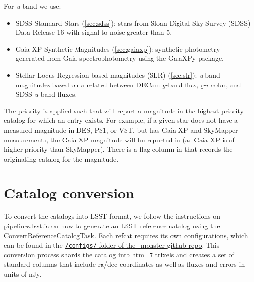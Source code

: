 For \textit{u}-band we use:
\begin{itemize}
    \item SDSS Standard Stars (\ref{sec:sdss}): stars from Sloan Digital Sky Survey (SDSS) Data Release 16 with signal-to-noise greater than 5.
    \item Gaia XP Synthetic Magnitudes (\ref{sec:gaiaxp}): synthetic photometry generated from Gaia spectrophotometry using the GaiaXPy package.
    \item Stellar Locus Regression-based magnitudes (SLR) (\ref{sec:slr}): \textit{u}-band magnitudes based on a related between DECam \textit{g}-band flux, \textit{g-r} color, and SDSS \textit{u}-band fluxes.
\end{itemize}

The priority is applied such that \monster will report a magnitude in the highest priority catalog for which an entry exists. For example, if a given star does not have a measured magnitude in DES, PS1, or VST, but has Gaia XP and SkyMapper measurements, the Gaia XP magnitude will be reported in \monster (as Gaia XP is of higher priority than SkyMapper). There is a flag column in \monster that records the originating catalog for the magnitude.

\section{Catalog conversion}
\label{sec:conversion}
To convert the catalogs into LSST format, we follow the instructions on \href{https://pipelines.lsst.io/modules/lsst.meas.algorithms/creating-a-reference-catalog.html}{pipelines.lsst.io} on how to generate an LSST reference catalog using the \href{https://pipelines.lsst.io/modules/lsst.meas.algorithms/tasks/lsst.meas.algorithms.ConvertReferenceCatalogTask.html#lsst-task-lsst-meas-algorithms-convertreferencecatalog-convertreferencecatalogtask}{ConvertReferenceCatalogTask}. Each refcat requires its own configurations, which can be found in the \href{https://github.com/lsst-dm/the_monster/tree/main/configs}{\texttt{/configs/} folder of the\_monster github repo}.
This conversion process shards the catalog into htm=7 trixels and creates a set of standard columns that include ra/dec coordinates as well as fluxes and errors in units of nJy.

